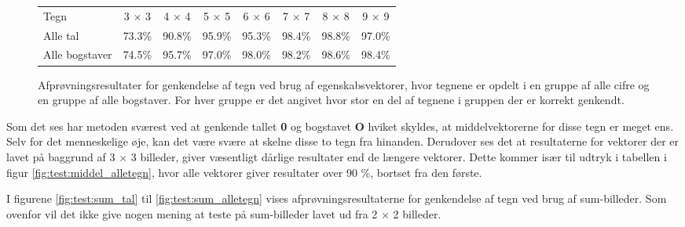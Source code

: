 \begin{figure}[htp]
\centering
\begin{tabular}{|l|c|c|c|c|c|c|c|}\hline
\rowcolor[gray]{0.9} \multicolumn{8}{|>{\columncolor[gray]{0.9}}c|}{\textbf{Genkendelse af tegn - Egenskabsvektor}} \\ \hline
Tegn & 3 $\times$ 3 & 4 $\times$ 4 & 5 $\times$ 5 & 6 $\times$ 6 & 7 $\times$ 7 & 8 $\times$ 8 & 9 $\times$ 9\\\hline
Alle tal & 73.3\% & 90.8\% & 95.9\% & 95.3\% & 98.4\% & 98.8\% & 97.0\%\\\hline
Alle bogstaver & 74.5\% & 95.7\% & 97.0\% & 98.0\% & 98.2\% & 98.6\% & 98.4\%\\\hline
\end{tabular}
\caption{Afprøvningsresultater for genkendelse af tegn ved brug af egenskabsvektorer, hvor tegnene er opdelt i en gruppe af alle cifre og en gruppe af alle bogstaver. For hver gruppe er det angivet hvor stor en del af tegnene i gruppen der er korrekt genkendt.}
\label{fig:test:middel_alletegn}
\end{figure}

Som det ses har metoden sværest ved at genkende tallet \textbf{0} og bogstavet \textbf{O} hviket skyldes, at middelvektorerne for disse tegn er meget ens. Selv for det menneskelige øje, kan det være svære at skelne disse to tegn fra hinanden. Derudover ses det at resultaterne for vektorer der er lavet på baggrund af 3 $\times$ 3 billeder, giver væsentligt dårlige resultater end de længere vektorer. Dette kommer især til udtryk i tabellen i figur \vref{fig:test:middel_alletegn}, hvor alle vektorer giver resultater over 90 \%, bortset fra den første.

I figurene \ref{fig:test:sum_tal} til \ref{fig:test:sum_alletegn} vises afprøvningsresultaterne for genkendelse af tegn ved brug af sum-billeder. Som ovenfor vil det ikke give nogen mening at teste på sum-billeder lavet ud fra 2 $\times$ 2 billeder.

